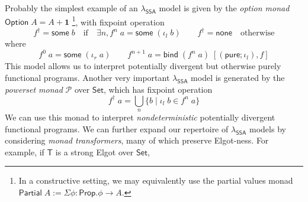 \documentclass[acmsmall,screen,review]{acmart}
\newcommand{\mc}[1]{\ensuremath{\mathcal{#1}}}
\newcommand{\mb}[1]{\ensuremath{\mathbf{#1}}}
\newcommand{\ms}[1]{\ensuremath{\mathsf{#1}}}
\newcommand{\isotopessa}{\(\lambda_{\ms{SSA}}\)}
\begin{document}
Probably the simplest example of an \isotopessa{} model is given by the
\emph{option monad} $\ms{Option}\;A = A + \mb{1}$
\footnote{
  In a constructive setting, we may equivalently use the partial values monad 
  $\ms{Partial}\;A := \Sigma \phi : \ms{Prop} . \phi \to A$.
},
with fixpoint operation
$$
  f^\dagger = \ms{some}\;b \quad \text{if} \quad \exists n, f^n\;a = \ms{some}\;(\iota_l\;b)
  \qquad
  f^\dagger = \ms{none} \quad \text{otherwise}
$$
where
$$
  f^0\;a = \ms{some}\;(\iota_r\;a) \qquad
  f^{n + 1}\;a = \ms{bind}\;(f^{n}\;a)\;[(\ms{pure};\iota_l), f] 
$$
This model allows us to interpret potentially divergent but otherwise purely functional programs.
Another very important \isotopessa{} model is generated by the \emph{powerset monad} $\mc{P}$ over
\ms{Set}, which has fixpoint operation
$$
  f^\dagger\;a = \bigcup_n\{b \mid \iota_l\;b \in f^n\;a\}
$$
We can use this monad to interpret \emph{nondeterministic} potentially divergent functional
programs. We can further expand our repertoire of \isotopessa{} models by considering \emph{monad
transformers}, many of which preserve Elgot-ness. For example, if $\ms{T}$ is a strong Elgot over
\ms{Set},
\end{document}
